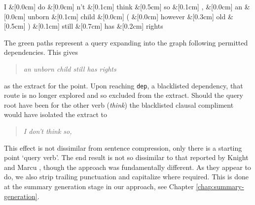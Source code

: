     \begin{center}
      \begin{dependency}[edge horizontal padding=0]
        \begin{deptext}
          I \&[0.0cm] do \&[0.0cm] n't \&[0.1cm] think \&[0.5cm] so \&[0.1cm] , \&[0.0cm] an \&[0.0cm] unborn \&[0.1cm] child \&[0.0cm] ( \&[0.0cm] however \&[0.3cm] old \&[0.5cm] ) \&[0.1cm] still \&[0.7cm] has \&[0.2cm] rights \\
        \end{deptext}





      \end{dependency}
    \end{center}

    The green paths represent a query expanding into the graph following permitted dependencies. This gives \blockquote{\textit{an unborn child still has rights}} as the extract for the point. Upon reaching \texttt{dep}, a blacklisted dependency, that route is no longer explored and so excluded from the extract. Should the query root have been for the other verb (\textit{think}) the blacklisted clausal compliment would have isolated the extract to \blockquote{\textit{I don't think so,}}.

    This effect is not dissimilar from sentence compression, only there is a starting point `query verb'. The end result is not so dissimilar to that reported by Knight and Marcu \cite{knight2000statistics}, though the approach was fundamentally different. As they appear to do, we also strip trailing punctuation and capitalize where required. This is done at the summary generation stage in our approach, see Chapter \ref{chap:summary-generation}.

